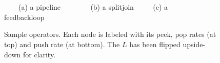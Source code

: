\begin{figure}
\begin{center}

\begin{minipage}{0.7in}
\centering {}
\end{minipage}
~~~~~~
\begin{minipage}{0.8in}
\centering {}
\end{minipage}
~~~~~~
\begin{minipage}{0.8in}
\centering {}
\end{minipage}

\vspace{0.1in}

{\small ~~~~(a) a pipeline ~~~~~~~ (b) a splitjoin ~~~~ (c) a feedbackloop~~~~}

\caption{\small Sample {\StreamIt} operators.  Each node is labeled
with its peek, pop rates (at top) and push rate (at bottom).  The $L$
{\filter} has been flipped upside-down for clarity.
\label{fig:steady-state}}
\vspace{-18pt}
\end{center}
\end{figure}




